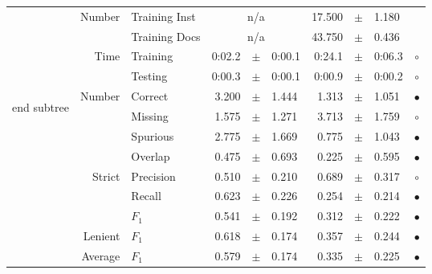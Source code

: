 \begin{longtable}{|r|r|l||rcl|rcl|c|}
\cline{2-10} & \multirow{2}{*}{    Number} &   Training Inst &    \multicolumn{3}{c|}{n/a}         &      17.500 &  $\pm$  &       1.180 &  \\
\cline{3-10} &                             &   Training Docs &    \multicolumn{3}{c|}{n/a}         &      43.750 &  $\pm$  &       0.436 &  \\
\cline{2-10} & \multirow{2}{*}{      Time} &        Training &      0:02.2 &  $\pm$  &      0:00.1 &      0:24.1 &  $\pm$  &      0:06.3 & $\circ$ \\
\cline{3-10} &                             &         Testing &      0:00.3 &  $\pm$  &      0:00.1 &      0:00.9 &  $\pm$  &      0:00.2 & $\circ$ \\
\hline
\hline
\multirow{11}{*}{\begin{sideways}end subtree\end{sideways} }
             & \multirow{4}{*}{    Number} &         Correct &       3.200 &  $\pm$  &       1.444 &       1.313 &  $\pm$  &       1.051 & $\bullet$ \\
\cline{3-10} &                             &         Missing &       1.575 &  $\pm$  &       1.271 &       3.713 &  $\pm$  &       1.759 & $\circ$ \\
\cline{3-10} &                             &        Spurious &       2.775 &  $\pm$  &       1.669 &       0.775 &  $\pm$  &       1.043 & $\bullet$ \\
\cline{3-10} &                             &         Overlap &       0.475 &  $\pm$  &       0.693 &       0.225 &  $\pm$  &       0.595 & $\bullet$ \\
\cline{2-10} & \multirow{3}{*}{    Strict} &       Precision &       0.510 &  $\pm$  &       0.210 &       0.689 &  $\pm$  &       0.317 & $\circ$ \\
\cline{3-10} &                             &          Recall &       0.623 &  $\pm$  &       0.226 &       0.254 &  $\pm$  &       0.214 & $\bullet$ \\
\cline{3-10} &                             &           $F_1$ &       0.541 &  $\pm$  &       0.192 &       0.312 &  $\pm$  &       0.222 & $\bullet$ \\
\cline{2-10} &                     Lenient &           $F_1$ &       0.618 &  $\pm$  &       0.174 &       0.357 &  $\pm$  &       0.244 & $\bullet$ \\
\cline{2-10} &                     Average &           $F_1$ &       0.579 &  $\pm$  &       0.174 &       0.335 &  $\pm$  &       0.225 & $\bullet$ \\

\end{longtable}
